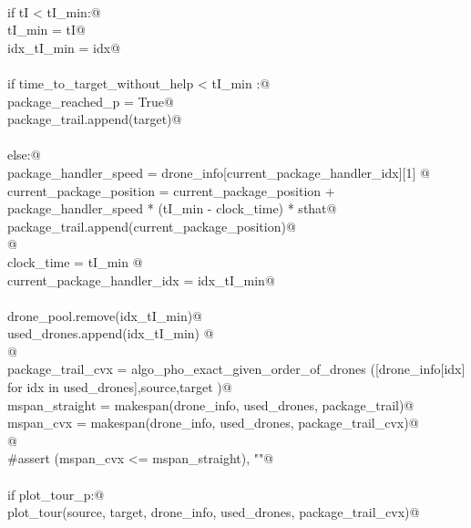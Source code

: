 \documentclass[12.0pt]{report}
\begin{document}
\begin{flushleft}
\begin{list}{}{}
\mbox{}\verb@@\\
\mbox{}\verb@                if tI < tI_min:@\\
\mbox{}\verb@                   tI_min     = tI@\\
\mbox{}\verb@                   idx_tI_min = idx@\\
\mbox{}\verb@@\\
\mbox{}\verb@          if time_to_target_without_help < tI_min :@\\
\mbox{}\verb@              package_reached_p = True@\\
\mbox{}\verb@              package_trail.append(target)@\\
\mbox{}\verb@@\\
\mbox{}\verb@          else:@\\
\mbox{}\verb@              package_handler_speed    = drone_info[current_package_handler_idx][1] @\\
\mbox{}\verb@              current_package_position = current_package_position + package_handler_speed * (tI_min - clock_time) *  sthat@\\
\mbox{}\verb@              package_trail.append(current_package_position)@\\
\mbox{}\verb@    @\\
\mbox{}\verb@              clock_time                  = tI_min @\\
\mbox{}\verb@              current_package_handler_idx = idx_tI_min@\\
\mbox{}\verb@@\\
\mbox{}\verb@              drone_pool.remove(idx_tI_min)@\\
\mbox{}\verb@              used_drones.append(idx_tI_min)  @\\
\mbox{}\verb@    @\\
\mbox{}\verb@    package_trail_cvx = algo_pho_exact_given_order_of_drones ([drone_info[idx] for idx in used_drones],source,target )@\\
\mbox{}\verb@    mspan_straight = makespan(drone_info, used_drones, package_trail)@\\
\mbox{}\verb@    mspan_cvx      = makespan(drone_info, used_drones, package_trail_cvx)@\\
\mbox{}\verb@    @\\
\mbox{}\verb@    #assert (mspan_cvx <= mspan_straight), ""@\\
\mbox{}\verb@@\\
\mbox{}\verb@    if plot_tour_p:@\\
\mbox{}\verb@         plot_tour(source, target, drone_info, used_drones, package_trail_cvx)@\\

\end{list}
\end{flushleft}
\end{document}
